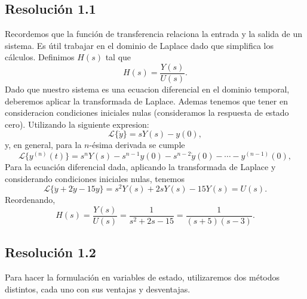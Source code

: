 \documentclass[
  11pt,
  letterpaper,
   addpoints,
   answers
  ]{exam}
\begin{document}
\begin{questions}
\begin{solution}
  \subsection*{Resolución 1.1}
  Recordemos que la función de transferencia relaciona la entrada y la salida de un sistema. Es útil trabajar en el dominio de Laplace dado que simplifica los cálculos. Definimos \(H(s)\) tal que
  \begin{equation}
    H(s) = \frac{Y(s)}{U(s)}.
  \end{equation}
 Dado que nuestro sistema es una ecuacion diferencial en el dominio temporal, deberemos aplicar la transformada de Laplace. Ademas tenemos que tener en consideracion condiciones iniciales nulas (consideramos la respuesta de estado cero). Utilizando la siguiente expresion:
 \begin{equation}
   \mathcal{L}\{\dot{y}\} = sY(s) - y(0),
 \end{equation}
  y, en general, para la $n$-ésima derivada se cumple
  \begin{equation}
    \mathcal{L}\{y^{(n)}(t)\}
    = s^{n} Y(s) - s^{n-1} y(0) - s^{n-2} \dot y(0) - \cdots - y^{(n-1)}(0),
  \end{equation}
  Para la ecuación diferencial dada, aplicando la transformada de Laplace y considerando condiciones iniciales nulas, tenemos
  \begin{equation}
    \mathcal{L}\{\ddot y + 2\dot y - 15 y\}
    = s^{2}Y(s) + 2sY(s) - 15Y(s) = U(s).
  \end{equation}
  Reordenando,
  \begin{equation}
    H(s) = \frac{Y(s)}{U(s)} = \frac{1}{s^{2} + 2s - 15}
    = \frac{1}{(s+5)(s-3)}.
  \end{equation}
  \subsection*{Resolución 1.2}
Para hacer la formulación en variables de estado, utilizaremos dos métodos distintos, cada uno con sus ventajas y desventajas.


\end{solution}
\end{questions}
\end{document}
